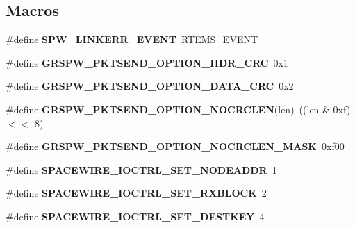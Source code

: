\subsection*{Macros}
\begin{DoxyCompactItemize}
\item 
\mbox{\label{group__spw_gae883f56794ba3881e39e67430d27f996}} 
\#define {\bfseries S\+P\+W\+\_\+\+L\+I\+N\+K\+E\+R\+R\+\_\+\+E\+V\+E\+NT}~\mbox{\hyperlink{group__ClassicEventSet_ga40310258a3cbe2bef8420158c59f6acc}{R\+T\+E\+M\+S\+\_\+\+E\+V\+E\+N\+T\+\_}}
\item 
\mbox{\label{group__spw_gaf27ab5d88e5034e325b23640f02ab30e}} 
\#define {\bfseries G\+R\+S\+P\+W\+\_\+\+P\+K\+T\+S\+E\+N\+D\+\_\+\+O\+P\+T\+I\+O\+N\+\_\+\+H\+D\+R\+\_\+\+C\+RC}~0x1
\item 
\mbox{\label{group__spw_gaafea6c387fae83f94e86c5589dd8943e}} 
\#define {\bfseries G\+R\+S\+P\+W\+\_\+\+P\+K\+T\+S\+E\+N\+D\+\_\+\+O\+P\+T\+I\+O\+N\+\_\+\+D\+A\+T\+A\+\_\+\+C\+RC}~0x2
\item 
\mbox{\label{group__spw_ga4b7cdb1eb0ac9893ca5b75164de99d91}} 
\#define {\bfseries G\+R\+S\+P\+W\+\_\+\+P\+K\+T\+S\+E\+N\+D\+\_\+\+O\+P\+T\+I\+O\+N\+\_\+\+N\+O\+C\+R\+C\+L\+EN}(len)~((len \& 0xf) $<$$<$ 8)
\item 
\mbox{\label{group__spw_ga09ebef12d318c556b566b14710094dbc}} 
\#define {\bfseries G\+R\+S\+P\+W\+\_\+\+P\+K\+T\+S\+E\+N\+D\+\_\+\+O\+P\+T\+I\+O\+N\+\_\+\+N\+O\+C\+R\+C\+L\+E\+N\+\_\+\+M\+A\+SK}~0xf00
\item 
\mbox{\label{group__spw_ga3d57f94593540aa911a8c1018a90969f}} 
\#define {\bfseries S\+P\+A\+C\+E\+W\+I\+R\+E\+\_\+\+I\+O\+C\+T\+R\+L\+\_\+\+S\+E\+T\+\_\+\+N\+O\+D\+E\+A\+D\+DR}~1
\item 
\mbox{\label{group__spw_gab33dfa193991993638b2d8fbf2963a56}} 
\#define {\bfseries S\+P\+A\+C\+E\+W\+I\+R\+E\+\_\+\+I\+O\+C\+T\+R\+L\+\_\+\+S\+E\+T\+\_\+\+R\+X\+B\+L\+O\+CK}~2
\item 
\mbox{\label{group__spw_ga461c070fc6c89323b7bc0b89feb717c9}} 
\#define {\bfseries S\+P\+A\+C\+E\+W\+I\+R\+E\+\_\+\+I\+O\+C\+T\+R\+L\+\_\+\+S\+E\+T\+\_\+\+D\+E\+S\+T\+K\+EY}~4
$$
\end{DoxyCompactItemize}
